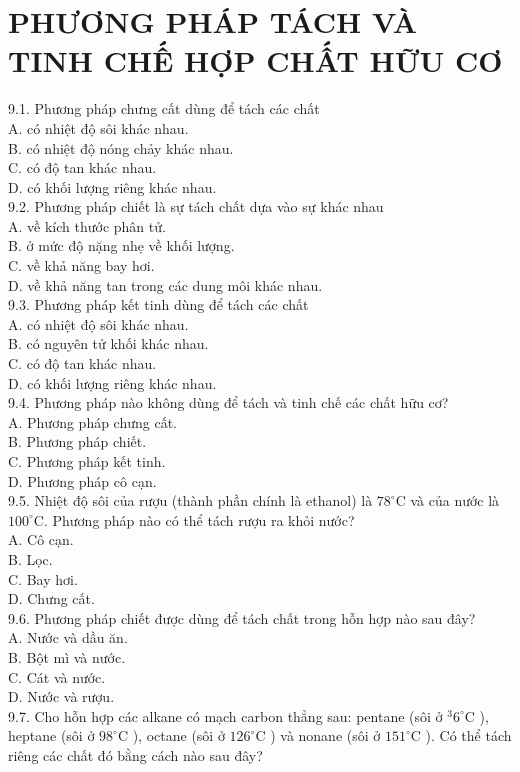 \documentclass[10pt]{article}
\begin{document}
\section*{PHƯƠNG PHÁP TÁCH VÀ TINH CHẾ HỢP CHẤT HỮU CƠ}
9.1. Phương pháp chưng cất dùng để tách các chất\\
A. có nhiệt độ sôi khác nhau.\\
B. có nhiệt độ nóng chảy khác nhau.\\
C. có độ tan khác nhau.\\
D. có khối lượng riêng khác nhau.\\
9.2. Phương pháp chiết là sự tách chất dựa vào sự khác nhau\\
A. về kích thước phân tử.\\
B. ở mức độ nặng nhẹ về khối lượng.\\
C. về khả năng bay hơi.\\
D. về khả năng tan trong các dung môi khác nhau.\\
9.3. Phương pháp kết tinh dùng để tách các chất\\
A. có nhiệt độ sôi khác nhau.\\
B. có nguyên tử khối khác nhau.\\
C. có độ tan khác nhau.\\
D. có khối lượng riêng khác nhau.\\
9.4. Phương pháp nào không dùng để tách và tinh chế các chất hữu cơ?\\
A. Phương pháp chưng cất.\\
B. Phương pháp chiết.\\
C. Phương pháp kết tinh.\\
D. Phương pháp cô cạn.\\
9.5. Nhiệt độ sôi của rượu (thành phần chính là ethanol) là $78^{\circ} \mathrm{C}$ và của nước là $100^{\circ} \mathrm{C}$. Phương pháp nào có thể tách rượu ra khỏi nước?\\
A. Cô cạn.\\
B. Lọc.\\
C. Bay hơi.\\
D. Chưng cất.\\
9.6. Phương pháp chiết được dùng để tách chất trong hỗn hợp nào sau đây?\\
A. Nước và dầu ăn.\\
B. Bột mì và nước.\\
C. Cát và nước.\\
D. Nước và rượu.\\
9.7. Cho hỗn hợp các alkane có mạch carbon thẳng sau: pentane (sôi ở $^{3} 6^{\circ} \mathrm{C}$ ), heptane (sôi ở $98^{\circ} \mathrm{C}$ ), octane (sôi ở $126^{\circ} \mathrm{C}$ ) và nonane (sôi ở $151^{\circ} \mathrm{C}$ ). Có thể tách riêng các chất đó bằng cách nào sau đây?\\
\end{document}

